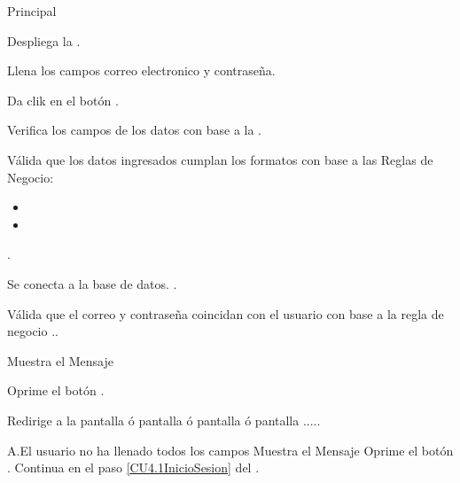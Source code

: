 	\begin{UCtrayectoria}{Principal}
	
		\UCpaso Despliega la .

		\UCpaso[\UCactor] Llena los campos correo electronico y contraseña.\label{CU4.1InicioSesion}

		\UCpaso[\UCactor] Da clik en el botón .\label{CU4.2ConectarBaseDatos}
		
		\UCpaso Verifica los campos de los datos con base a la  .
		
		\UCpaso Válida que los datos ingresados cumplan los formatos con base a las Reglas de Negocio: 
				
			\begin{itemize}
				\item	{} 
				\item	{} 
			\end{itemize} 
		.

		\UCpaso Se conecta a la base de datos. .

		\UCpaso Válida que el correo y contraseña coincidan con el usuario con base a la regla de negocio ..

		\UCpaso Muestra el Mensaje 

		\UCpaso[\UCactor] Oprime el botón .

		\UCpaso Redirige a la pantalla  ó pantalla  ó pantalla  ó pantalla .....
		

	\end{UCtrayectoria}


		
		
		\begin{UCtrayectoriaA}{A.}{El usuario no ha llenado todos los campos}
			\UCpaso Muestra el Mensaje 
			\UCpaso[\UCactor] Oprime el botón .
			\UCpaso Continua en el paso \ref{CU4.1InicioSesion} del .
			
		\end{UCtrayectoriaA}


